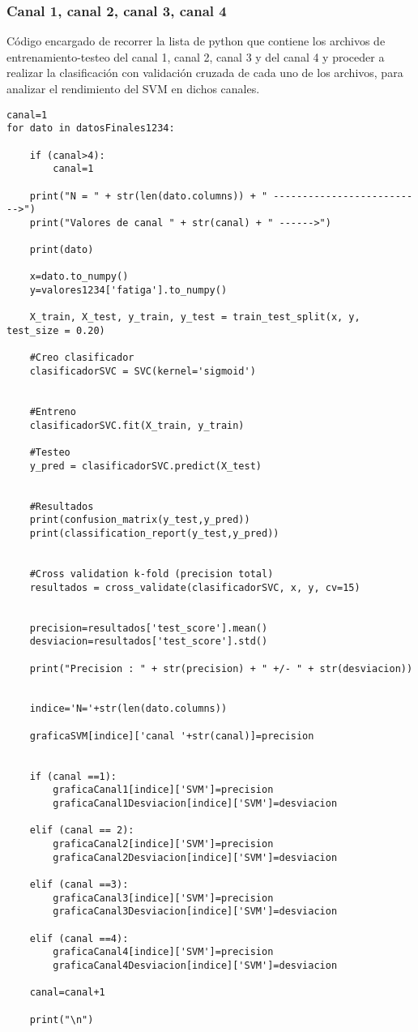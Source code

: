 \subsubsection{Canal 1, canal 2, canal 3, canal 4}
Código encargado de recorrer la lista de python que contiene los archivos de entrenamiento-testeo del canal 1, canal 2, canal 3 y del canal 4 y proceder a realizar la clasificación con validación cruzada de cada uno de los archivos, para analizar el rendimiento del SVM en dichos canales.

\begin{lstlisting}
canal=1
for dato in datosFinales1234:
    
    if (canal>4):
        canal=1
    
    print("N = " + str(len(dato.columns)) + " -------------------------->")
    print("Valores de canal " + str(canal) + " ------>")
    
    print(dato)
    
    x=dato.to_numpy()
    y=valores1234['fatiga'].to_numpy()
    
    X_train, X_test, y_train, y_test = train_test_split(x, y, test_size = 0.20)

    #Creo clasificador
    clasificadorSVC = SVC(kernel='sigmoid')


    #Entreno
    clasificadorSVC.fit(X_train, y_train)

    #Testeo 
    y_pred = clasificadorSVC.predict(X_test)

    
    #Resultados
    print(confusion_matrix(y_test,y_pred))
    print(classification_report(y_test,y_pred))
    
    
    #Cross validation k-fold (precision total)
    resultados = cross_validate(clasificadorSVC, x, y, cv=15)
    
    
    precision=resultados['test_score'].mean()
    desviacion=resultados['test_score'].std()
    
    print("Precision : " + str(precision) + " +/- " + str(desviacion))
    
    
    indice='N='+str(len(dato.columns))
    
    graficaSVM[indice]['canal '+str(canal)]=precision
    
    
    if (canal ==1):
        graficaCanal1[indice]['SVM']=precision
        graficaCanal1Desviacion[indice]['SVM']=desviacion
        
    elif (canal == 2):
        graficaCanal2[indice]['SVM']=precision
        graficaCanal2Desviacion[indice]['SVM']=desviacion
        
    elif (canal ==3):
        graficaCanal3[indice]['SVM']=precision
        graficaCanal3Desviacion[indice]['SVM']=desviacion
        
    elif (canal ==4):
        graficaCanal4[indice]['SVM']=precision
        graficaCanal4Desviacion[indice]['SVM']=desviacion
        
    canal=canal+1
    
    print("\n")
\end{lstlisting}


